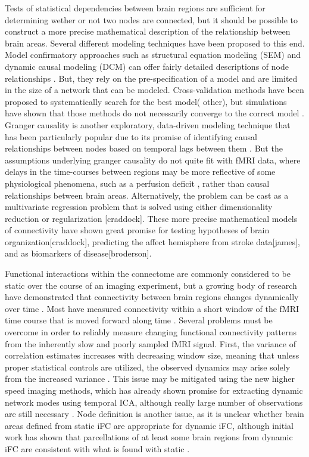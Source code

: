Tests of statistical dependencies between brain regions are sufficient for determining wether or not two nodes are connected, but it should be possible to construct a more precise mathematical description of the relationship between brain areas. Several different modeling techniques have been proposed to this end. Model confirmatory approaches such as structural equation modeling (SEM) and dynamic causal modeling (DCM) can offer fairly detailed descriptions of node relationships . But, they rely on the pre-specification of a model and are limited in the size of a network that can be modeled. Cross-validation methods have been proposed to systematically search for the best model(\cite{GAJames} other), but simulations have shown that those methods do not necessarily converge to the correct model \cite{lohman}. Granger causality is another exploratory, data-driven modeling technique that has been particularly popular due to its promise of identifying causal relationships between nodes based on temporal lags between them \cite{}. But the assumptions underlying granger causality do not quite fit with fMRI data, where delays in the time-courses between regions may be more reflective of some physiological phenomena, such as a perfusion deficit \cite{Lv}, rather than causal relationships between brain areas. Alternatively, the problem can be cast as a multivariate regression problem that is solved using either dimensionality reduction or regularization [craddock]. These more precise mathematical models of connectivity have shown great promise for testing hypotheses of brain organization[craddock], predicting the affect hemisphere from stroke data[james], and as biomarkers of disease[broderson].

Functional interactions within the connectome are commonly considered to be static over the course of an imaging experiment, but a growing body of research have demonstrated that connectivity between brain regions changes dynamically over time \cite{Chang, Keilholz,Hutchinson2013, Fu2013, Zhen}. Most have measured connectivity within a short window of the fMRI time course that is moved forward along time \cite{}. Several problems must be overcome in order to reliably measure changing functional connectivity patterns from the inherently slow and poorly sampled fMRI signal. First, the variance of correlation estimates increases with decreasing window size, meaning that unless proper statistical controls are utilized, the observed dynamics may arise solely from the increased variance \cite{}. This issue may be mitigated using the new higher speed imaging methods, which has already shown promise for extracting dynamic network modes using temporal ICA, although really large number of observations are still necessary \cite{Smith2012}. Node definition is another issue, as it is unclear whether brain areas defined from static iFC are appropriate for dynamic iFC, although initial work has shown that parcellations of at least some brain regions from dynamic iFC are consistent with what is found with static \cite{Yang2013}.

